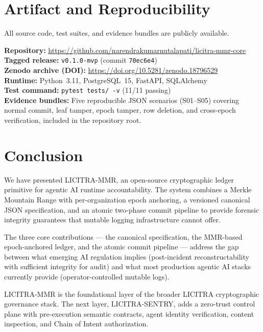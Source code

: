 \documentclass[sigconf,natbib=false]{acmart}
\begin{document}
\section{Artifact and Reproducibility}
\label{sec:artifacts}

All source code, test suites, and evidence bundles are publicly available.

\textbf{Repository:} \url{https://github.com/narendrakumarnutalapati/licitra-mmr-core}\\
\textbf{Tagged release:} \texttt{v0.1.0-mvp} (commit \texttt{70ec6e4})\\
\textbf{Zenodo archive (DOI):} \url{https://doi.org/10.5281/zenodo.18796529}\\
\textbf{Runtime:} Python~3.11, PostgreSQL~15, FastAPI, SQLAlchemy\\
\textbf{Test command:} \texttt{pytest tests/ -v} (11/11 passing)\\
\textbf{Evidence bundles:} Five reproducible JSON scenarios (S01--S05)
covering normal commit, leaf tamper, epoch tamper, row deletion, and
cross-epoch verification, included in the repository root.

\section{Conclusion}
\label{sec:conclusion}

We have presented LICITRA-MMR, an open-source cryptographic ledger primitive
for agentic AI runtime accountability. The system combines a Merkle Mountain
Range with per-organization epoch anchoring, a versioned canonical JSON
specification, and an atomic two-phase commit pipeline to provide forensic
integrity guarantees that mutable logging infrastructure cannot offer.

The three core contributions --- the canonical specification, the
MMR-based epoch-anchored ledger, and the atomic commit pipeline --- address
the gap between what emerging AI regulation implies (post-incident
reconstructability with sufficient integrity for audit) and what most
production agentic AI stacks currently provide (operator-controlled mutable
logs).

LICITRA-MMR is the foundational layer of the broader LICITRA cryptographic
governance stack. The next layer, LICITRA-SENTRY, adds a zero-trust control
plane with pre-execution semantic contracts, agent identity verification,
content inspection, and Chain of Intent authorization.
\end{document}
